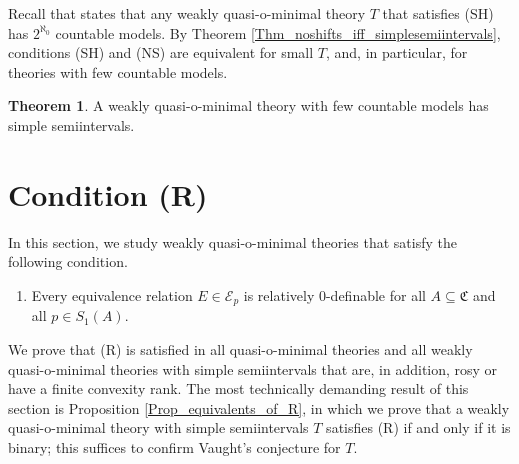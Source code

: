\documentclass{amsart}
\theoremstyle{definition}
\newtheorem{Theorem}{Theorem}[section]
\theoremstyle{definition}
\newcommand{\Mon}{\mathfrak C}
\begin{document}
Recall that \cite[Theorem 1]{MTwqom1} states that any weakly quasi-o-minimal theory $T$ that satisfies (SH) has $2^{\aleph_0}$ countable models. By Theorem \ref{Thm_noshifts_iff_simplesemiintervals}, conditions (SH) and (NS) are equivalent for small $T$, and, in particular, for theories with few countable models. 

\begin{Theorem}\label{Theorem few models implies simple semiintervals}
A weakly quasi-o-minimal theory with few countable models has simple semiintervals. 
\end{Theorem}




\section{Condition (R)}\label{Section_(R)}


In this section, we study weakly quasi-o-minimal theories that satisfy the following condition. 
\begin{enumerate}[\hspace{10pt}(1)]
\item[(R)] Every equivalence relation $E\in \mathcal E_p$ is relatively 0-definable for all $A\subseteq \Mon$ and all $p\in S_1(A)$.
\end{enumerate}
We prove that (R) is satisfied in all quasi-o-minimal theories and all weakly quasi-o-minimal theories with simple semiintervals that are, in addition, rosy or have a finite convexity rank. 
The most technically demanding result of this section is Proposition \ref{Prop_equivalents_of_R}, in which we prove that a weakly quasi-o-minimal theory with simple semiintervals $T$ satisfies (R) if and only if it is binary; this suffices to confirm Vaught's conjecture for $T$.
\end{document}
